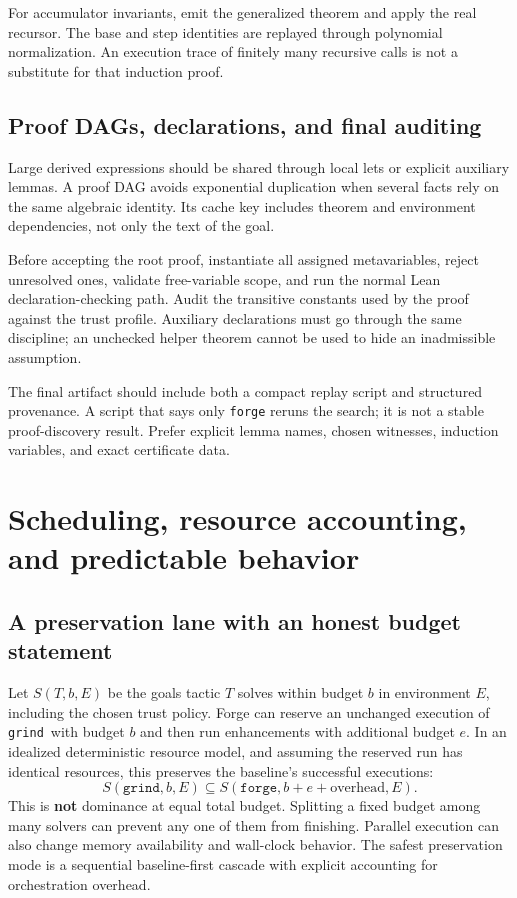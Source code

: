 \documentclass[11pt,a4paper]{article}
\newcommand{\grind}{\texttt{grind}}
\newcommand{\forge}{\texttt{forge}}
\begin{document}
For accumulator invariants, emit the generalized theorem and apply the real recursor. The base and step identities are replayed through polynomial normalization. An execution trace of finitely many recursive calls is not a substitute for that induction proof.

\subsection{Proof DAGs, declarations, and final auditing}

Large derived expressions should be shared through local lets or explicit auxiliary lemmas. A proof DAG avoids exponential duplication when several facts rely on the same algebraic identity. Its cache key includes theorem and environment dependencies, not only the text of the goal.

Before accepting the root proof, instantiate all assigned metavariables, reject unresolved ones, validate free-variable scope, and run the normal Lean declaration-checking path. Audit the transitive constants used by the proof against the trust profile. Auxiliary declarations must go through the same discipline; an unchecked helper theorem cannot be used to hide an inadmissible assumption.

The final artifact should include both a compact replay script and structured provenance. A script that says only \texttt{forge} reruns the search; it is not a stable proof-discovery result. Prefer explicit lemma names, chosen witnesses, induction variables, and exact certificate data.

\section{Scheduling, resource accounting, and predictable behavior}
\label{sec:scheduling}

\subsection{A preservation lane with an honest budget statement}

Let $S(T,b,E)$ be the goals tactic $T$ solves within budget $b$ in environment $E$, including the chosen trust policy. Forge can reserve an unchanged execution of \grind\ with budget $b$ and then run enhancements with additional budget $e$. In an idealized deterministic resource model, and assuming the reserved run has identical resources, this preserves the baseline's successful executions:
\[
S(\grind,b,E)\subseteq S(\forge,b+e+\text{overhead},E).
\]
This is \textbf{not} dominance at equal total budget. Splitting a fixed budget among many solvers can prevent any one of them from finishing. Parallel execution can also change memory availability and wall-clock behavior. The safest preservation mode is a sequential baseline-first cascade with explicit accounting for orchestration overhead.
\end{document}

